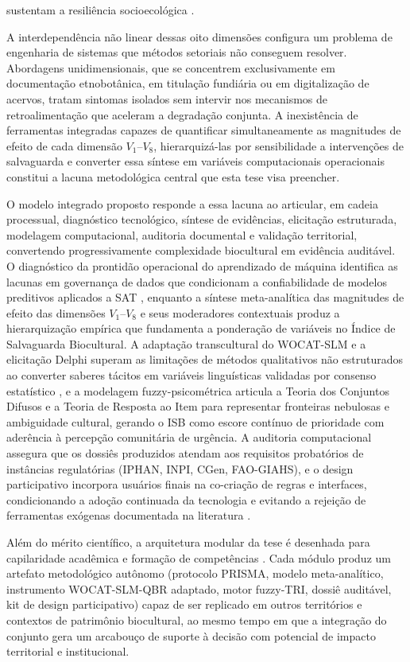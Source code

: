 sustentam a resiliência socioecológica \cite{Savo2016,Aniah2019}.

A interdependência não linear dessas oito dimensões configura um problema de engenharia de sistemas que métodos setoriais não conseguem resolver. Abordagens unidimensionais, que se concentrem exclusivamente em documentação etnobotânica, em titulação fundiária ou em digitalização de acervos, tratam sintomas isolados sem intervir nos mecanismos de retroalimentação que aceleram a degradação conjunta. A inexistência de ferramentas integradas capazes de quantificar simultaneamente as magnitudes de efeito de cada dimensão $V_{1}$--$V_{8}$, hierarquizá-las por sensibilidade a intervenções de salvaguarda e converter essa síntese em variáveis computacionais operacionais constitui a lacuna metodológica central que esta tese visa preencher.

O modelo integrado proposto responde a essa lacuna ao articular, em cadeia processual, diagnóstico tecnológico, síntese de evidências, elicitação estruturada, modelagem computacional, auditoria documental e validação territorial, convertendo progressivamente complexidade biocultural em evidência auditável. O diagnóstico da prontidão operacional do aprendizado de máquina identifica as lacunas em governança de dados que condicionam a confiabilidade de modelos preditivos aplicados a SAT \cite{Wilkinson2016,Rudin2019}, enquanto a síntese meta-analítica das magnitudes de efeito das dimensões $V_{1}$--$V_{8}$ e seus moderadores contextuais produz a hierarquização empírica que fundamenta a ponderação de variáveis no Índice de Salvaguarda Biocultural. A adaptação transcultural do WOCAT-SLM e a elicitação Delphi superam as limitações de métodos qualitativos não estruturados ao converter saberes tácitos em variáveis linguísticas validadas por consenso estatístico \cite{WOCAT2023,Linstone1975}, e a modelagem fuzzy-psicométrica articula a Teoria dos Conjuntos Difusos \cite{Zadeh1965} e a Teoria de Resposta ao Item para representar fronteiras nebulosas e ambiguidade cultural, gerando o ISB como escore contínuo de prioridade com aderência à percepção comunitária de urgência. A auditoria computacional assegura que os dossiês produzidos atendam aos requisitos probatórios de instâncias regulatórias (IPHAN, INPI, CGen, FAO-GIAHS), e o design participativo incorpora usuários finais na co-criação de regras e interfaces, condicionando a adoção continuada da tecnologia e evitando a rejeição de ferramentas exógenas documentada na literatura \cite{Schuler1993}.

Além do mérito científico, a arquitetura modular da tese é desenhada para capilaridade acadêmica e formação de competências \cite{Creswell2018}. Cada módulo produz um artefato metodológico autônomo (protocolo PRISMA, modelo meta-analítico, instrumento WOCAT-SLM-QBR adaptado, motor fuzzy-TRI, dossiê auditável, kit de design participativo) capaz de ser replicado em outros territórios e contextos de patrimônio biocultural, ao mesmo tempo em que a integração do conjunto gera um arcabouço de suporte à decisão com potencial de impacto territorial e institucional.


